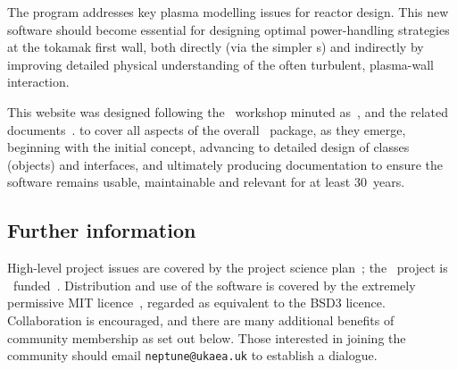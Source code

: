 
The program addresses key plasma modelling issues for reactor design.
This new software should become essential for designing optimal 
power-handling strategies at the tokamak first wall, both directly (via the 
simpler \papp s) and indirectly by improving detailed physical understanding of the 
often turbulent,  plasma-wall interaction.

This website was designed following the \nep \ workshop minuted as~\cite{y3re181},
and the related documents~\cite{y2d34,y3re314}.
to cover all aspects of the overall \nep \ package, as they emerge,
beginning with the initial concept, advancing to detailed design
of classes (objects) and  interfaces, and ultimately producing documentation
to ensure the software remains usable, maintainable and relevant for at least 30~years.

\subsection{Further information}
High-level project issues are covered by the project science plan~\cite{sciplan};
the \nep \ project is \exc \ funded~\cite{exch+eswebsite}. 
Distribution and use of the software is covered by the extremely
permissive MIT licence~\cite{MITlicense}, regarded as equivalent to the BSD3 licence.
Collaboration is encouraged, and there are many additional benefits of community membership
as set out below. Those interested in joining the community should
 email {\tt neptune@ukaea.uk} to establish a dialogue.


